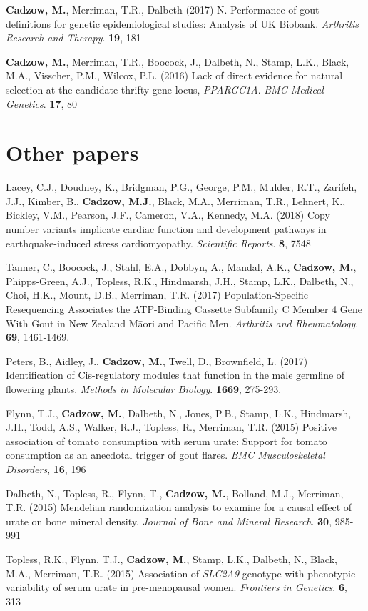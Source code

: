 \documentclass[]{report}
\begin{document}
\begin{appendices}
\textbf{Cadzow, M.}, Merriman, T.R., Dalbeth (2017) N. Performance of
gout definitions for genetic epidemiological studies: Analysis of UK
Biobank. \emph{Arthritis Research and Therapy}. \textbf{19}, 181

\textbf{Cadzow, M.}, Merriman, T.R., Boocock, J., Dalbeth, N., Stamp,
L.K., Black, M.A., Visscher, P.M., Wilcox, P.L. (2016) Lack of direct
evidence for natural selection at the candidate thrifty gene locus,
\emph{PPARGC1A}. \emph{BMC Medical Genetics}. \textbf{17}, 80

\section{Other papers}\label{other-papers}

Lacey, C.J., Doudney, K., Bridgman, P.G., George, P.M., Mulder, R.T.,
Zarifeh, J.J., Kimber, B., \textbf{Cadzow, M.J.}, Black, M.A., Merriman,
T.R., Lehnert, K., Bickley, V.M., Pearson, J.F., Cameron, V.A., Kennedy,
M.A. (2018) Copy number variants implicate cardiac function and
development pathways in earthquake-induced stress cardiomyopathy.
\emph{Scientific Reports}. \textbf{8}, 7548

Tanner, C., Boocock, J., Stahl, E.A., Dobbyn, A., Mandal, A.K.,
\textbf{Cadzow, M.}, Phipps-Green, A.J., Topless, R.K., Hindmarsh, J.H.,
Stamp, L.K., Dalbeth, N., Choi, H.K., Mount, D.B., Merriman, T.R. (2017)
Population-Specific Resequencing Associates the ATP-Binding Cassette
Subfamily C Member 4 Gene With Gout in New Zealand Māori and Pacific
Men. \emph{Arthritis and Rheumatology}. \textbf{69}, 1461-1469.

Peters, B., Aidley, J., \textbf{Cadzow, M.}, Twell, D., Brownfield, L.
(2017) Identification of Cis-regulatory modules that function in the
male germline of flowering plants. \emph{Methods in Molecular Biology}.
\textbf{1669}, 275-293.

Flynn, T.J., \textbf{Cadzow, M.}, Dalbeth, N., Jones, P.B., Stamp, L.K.,
Hindmarsh, J.H., Todd, A.S., Walker, R.J., Topless, R., Merriman, T.R.
(2015) Positive association of tomato consumption with serum urate:
Support for tomato consumption as an anecdotal trigger of gout flares.
\emph{BMC Musculoskeletal Disorders}, \textbf{16}, 196

Dalbeth, N., Topless, R., Flynn, T., \textbf{Cadzow, M.}, Bolland, M.J.,
Merriman, T.R. (2015) Mendelian randomization analysis to examine for a
causal effect of urate on bone mineral density. \emph{Journal of Bone
and Mineral Research}. \textbf{30}, 985-991

Topless, R.K., Flynn, T.J., \textbf{Cadzow, M.}, Stamp, L.K., Dalbeth,
N., Black, M.A., Merriman, T.R. (2015) Association of \emph{SLC2A9}
genotype with phenotypic variability of serum urate in pre-menopausal
women. \emph{Frontiers in Genetics}. \textbf{6}, 313

\end{appendices}
\end{document}
